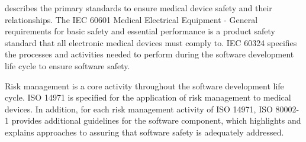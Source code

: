  describes the primary standards to ensure medical device safety and their relationships. The IEC 60601 Medical Electrical Equipment - General requirements for basic safety and essential performance is a product safety standard that all electronic medical devices must comply to. IEC 60324 specifies the processes and activities needed to perform during the software development life cycle to ensure software safety. 

Risk management is a core activity throughout the software development life cycle. ISO 14971 is specified for the application of risk management to medical devices. In addition, for each risk management activity of ISO 14971, ISO 80002-1 provides additional guidelines for the software component, which highlights and explains approaches to assuring that software safety is adequately addressed.



